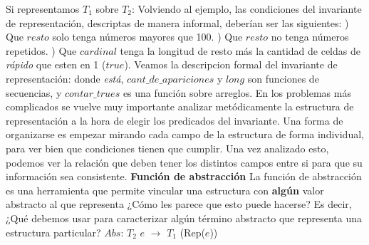\documentclass[10pt,a4paper]{article}
\begin{document}
Si representamos $T_{1}$ sobre $T_{2}$:
\newline
{}
\medskip
\medskip
Volviendo al ejemplo, las condiciones del invariante de representación, descriptas de manera informal, deberían ser las siguientes:
\newline
{}) Que $resto$ solo tenga números mayores que 100.
\newline
{}) Que $resto$ no tenga números repetidos.
\newline
{}) Que $cardinal$ tenga la longitud de resto más la cantidad de celdas de \textit{rápido} que esten en 1 ($true$).
\newline
\newline
Veamos la descripcion formal del invariante de representación: 
\newline
{}
\medskip
\medskip
\medskip
donde \textit{está}, $cant\_de\_apariciones$ y $long$ son funciones de secuencias, y $contar\_trues$ es una función sobre arreglos. En los problemas más complicados se vuelve muy importante analizar metódicamente la estructura de representación a la hora de elegir los predicados del invariante. Una forma de organizarse es empezar mirando cada campo de la estructura de forma individual, para ver bien que condiciones tienen que cumplir. Una vez analizado esto, podemos ver la relación que deben tener los distintos campos entre si para que su información sea consistente.
\newline
\newline
\textbf{Función de abstracción}
\newline
\newline
La función de abstracción es una herramienta que permite vincular una estructura con \textbf{algún} valor abstracto al que representa ¿Cómo les parece que esto puede hacerse? Es decir, ¿Qué debemos usar para caracterizar algún término abstracto que representa una estructura particular?
\newline
\newline
$Abs$: $T_{2}$ $e$ $\rightarrow$ $T_{1}$ (Rep($e$))
\newline
\end{document}
